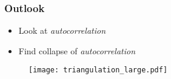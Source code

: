 \begin{frame}
    \frametitle{Outlook}
    \begin{itemize}
        \item Look at \emph{autocorrelation}
        \item Find collapse of \emph{autocorrelation}
    \end{itemize}
    \begin{figure}
        \centering
        \texttt{[image: triangulation\_large.pdf]}
    \end{figure}
\end{frame}